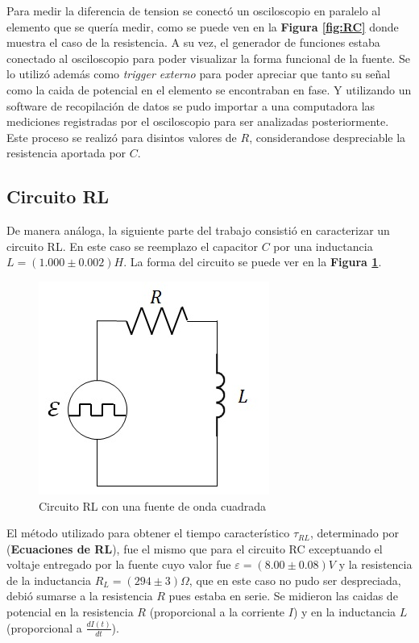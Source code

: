 \documentclass[11pt,a4paper]{article}
\begin{document}
Para medir la diferencia de tension se conectó un osciloscopio en paralelo al elemento que se quería medir, como se puede ven en la \textbf{Figura \ref{fig:RC}} donde muestra el caso de la resistencia. A su vez, el generador de funciones estaba conectado al osciloscopio para poder visualizar la forma funcional de la fuente. Se lo utilizó además como \textit{trigger externo} para poder apreciar que tanto su señal como la caida de potencial en el elemento se encontraban en fase. Y utilizando un software de recopilación de datos se pudo importar a una computadora las mediciones registradas por el osciloscopio para ser analizadas posteriormente. Este proceso se realizó para disintos valores de $R$, considerandose despreciable la resistencia aportada por $C$.

\subsection{Circuito RL}

De manera análoga, la siguiente parte del trabajo consistió en caracterizar un circuito RL. En este caso se reemplazo el capacitor $C$ por una inductancia $L = (1.000 \pm 0.002) H$. La forma del circuito se puede ver en la \textbf{Figura \ref{fig:RL}}.

\begin{figure}[h]
\centering
\includegraphics[scale=0.7]{Circuito-RL}
  \caption{Circuito RL con una fuente de onda cuadrada}
  \label{fig:RL}
\end{figure}

El método utilizado para obtener el tiempo característico $\tau_{RL}$, determinado por (\textbf{Ecuaciones de RL}), fue el mismo que para el circuito RC exceptuando el voltaje entregado por la fuente cuyo valor fue $\varepsilon = (8.00 \pm 0.08)V$ y la resistencia de la inductancia $R_L = (294 \pm 3) \Omega$, que en este caso no pudo ser despreciada, debió sumarse a la resistencia $R$ pues estaba en serie. Se midieron las caidas de potencial en la resistencia $R$ (proporcional a la corriente $I$) y en la inductancia $L$ (proporcional a $\frac{dI(t)}{dt}$).
\end{document}
